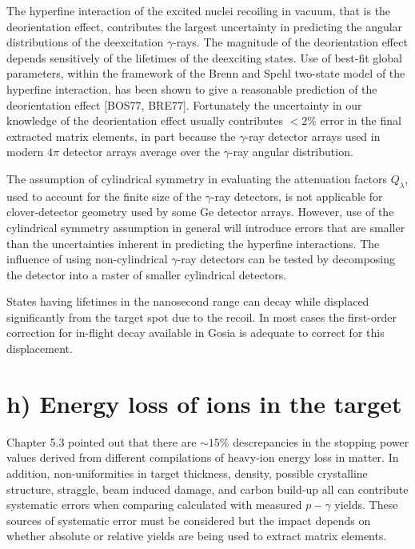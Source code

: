 \documentclass[10pt]{article}
\begin{document}
The hyperfine interaction of the excited nuclei recoiling in vacuum, that is the deorientation effect, contributes the largest uncertainty in predicting the angular distributions of the deexcitation $\gamma$-rays. The magnitude of the deorientation effect depends sensitively of the lifetimes of the deexciting states. Use of best-fit global parameters, within the framework of the Brenn and Spehl two-state model of the hyperfine interaction, has been shown to give a reasonable prediction of the deorientation effect [BOS77, BRE77]. Fortunately the uncertainty in our knowledge of the deorientation effect usually contributes $<2 \%$ error in the final extracted matrix elements, in part because the $\gamma$-ray detector arrays used in modern $4 \pi$ detector arrays average over the $\gamma$-ray angular distribution.

The assumption of cylindrical symmetry in evaluating the attenuation factors $Q_{\lambda}$, used to account for the finite size of the $\gamma$-ray detectors, is not applicable for clover-detector geometry used by some Ge detector arrays. However, use of the cylindrical symmetry assumption in general will introduce errors that are smaller than the uncertainties inherent in predicting the hyperfine interactions. The influence of using non-cylindrical $\gamma$-ray detectors can be tested by decomposing the detector into a raster of smaller cylindrical detectors.

States having lifetimes in the nanosecond range can decay while displaced significantly from the target spot due to the recoil. In most cases the first-order correction for in-flight decay available in Gosia is adequate to correct for this displacement.

\section*{h) Energy loss of ions in the target}
Chapter 5.3 pointed out that there are $\sim 15 \%$ descrepancies in the stopping power values derived from different compilations of heavy-ion energy loss in matter. In addition, non-uniformities in target thickness, density, possible crystalline structure, straggle, beam induced damage, and carbon build-up all can contribute systematic errors when comparing calculated with measured $p-\gamma$ yields. These sources of systematic error must be considered but the impact depends on whether absolute or relative yields are being used to extract matrix elements.
\end{document}
